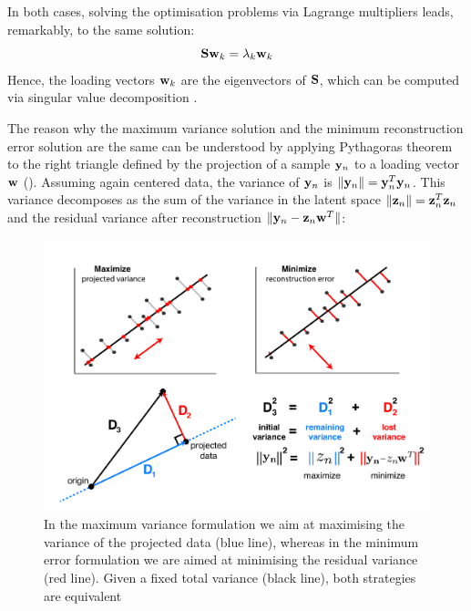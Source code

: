 In both cases, solving the optimisation problems via Lagrange multipliers leads, remarkably, to the same solution:
\begin{equation}
	{\bf S} {\bf w}_k = \lambda_k {\bf w}_k
\end{equation}
Hence, the loading vectors ${\bf w}_k$ are the eigenvectors of ${\bf S}$, which can be computed via singular value decomposition \cite{Bishop}.

The reason why the maximum variance solution and the minimum reconstruction error solution are the same can be understood by applying Pythagoras theorem to the right triangle defined by the projection of a sample ${\bf y}_{n}$ to a loading vector ${\bf w}$ ().
Assuming again centered data, the variance of ${\bf y}_{n}$ is $\|{\bf y}_{n}\| = {\bf y}_{n}^T {\bf y}_{n}$. This variance decomposes as the sum of the variance in the latent space $\|{\bf z}_{n}\| = {\bf z}_{n}^T {\bf z}_{n}$ and the residual variance after reconstruction $\|{\bf y}_{n} - {\bf z}_{n} {\bf w}^T \|$:

\begin{figure}[H]
	\centering
	\includegraphics[width=0.9\linewidth]{pca2}
	\caption[Maximizing the variance in the principal component space is equivalent to minimizing the data reconstruction error]{In the maximum variance formulation we aim at maximising the variance of the projected data (blue line), whereas in the minimum error formulation we are aimed at minimising the residual variance (red line). Given a fixed total variance (black line), both strategies are equivalent}
	\label{fig:pca2}
\end{figure}

